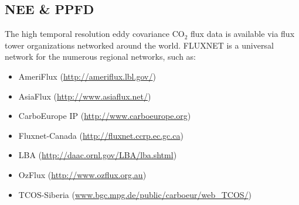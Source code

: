 \subsection{NEE \& PPFD}
\label{sec:gepfluxd}
The high temporal resolution eddy covariance CO$_2$ flux data is available via flux tower organizations networked around the world.  
FLUXNET\footnotemark {} is a universal network for the numerous regional networks, such as:

\begin{itemize} \itemsep1pt
    \item AmeriFlux (\url{http://ameriflux.lbl.gov/})
    \item AsiaFlux (\url{http://www.asiaflux.net/})
    \item CarboEurope IP (\url{http://www.carboeurope.org})
    \item Fluxnet-Canada (\url{http://fluxnet.ccrp.ec.gc.ca})
    \item LBA (\url{http://daac.ornl.gov/LBA/lba.shtml})
    \item OzFlux (\url{http://www.ozflux.org.au})
    \item TCOS-Siberia (\url{www.bgc.mpg.de/public/carboeur/web_TCOS/})
\end{itemize}

